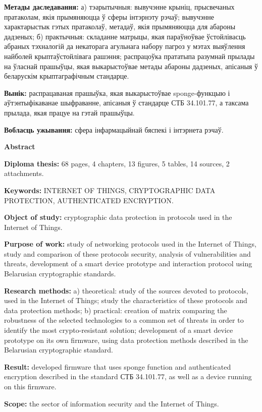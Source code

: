 \textbf{Метады даследавання:} а) тэарытычныя: вывучэнне крыніц, прысвечаных пратаколам, якія прымяняюцца 
ў сферы інтэрнэту рэчаў; вывучэнне характарыстык гэтых пратаколаў, метадаў, якія прымяняюцца для абароны 
дадзеных; б) практычныя: складанне матрыцы, якая параўноўвае ўстойлівасць абраных тэхналогій да некаторага 
агульнага набору пагроз у мэтах выяўлення найболей крыптаўстойлівага рашэння; распрацоўка прататыпа 
разумнай прылады на ўласнай прашыўцы, якая выкарыстоўвае метады абароны дадзеных, апісаныя ў беларускім 
крыптаграфічным стандарце.

\textbf{Вынік:} распрацаваная прашыўка, якая выкарыстоўвае sponge-функцыю і аўтэнтыфікаванае шыфраванне, 
апісаныя ў стандарце СТБ 34.101.77, а таксама прылада, якая працуе на гэтай прашыўцы.

\textbf{Вобласць ужывання:} сфера інфармацыйнай бяспекі і інтэрнета рэчаў.


\newpage
\begin{center}{\bf \Large Abstract}\end{center}

\textbf{Diploma thesis:} 68 pages, 4 chapters, 13 figures, 5 tables, 14 sources, 2 attachments.

\textbf{Keywords:} INTERNET OF THINGS, CRYPTOGRAPHIC DATA \newline PROTECTION, 
AUTHENTICATED ENCRYPTION.

\textbf{Object of study:} cryptographic data protection in protocols used in the Internet of Things.

\textbf{Purpose of work:} study of networking protocols used in the Internet of Things, study and 
comparison of these protocols security, analysis of vulnerabilities and threats, development 
of a smart device prototype and interaction protocol using Belarusian cryptographic standards.

\textbf{Research methods:} a) theoretical: study of the sources devoted to protocols, used in the 
Internet of Things; study the characteristics of these protocols and data protection methods; 
b) practical: creation of matrix comparing the robustness of the selected technologies to a common 
set of threats in order to identify the most crypto-resistant solution; development 
of a smart device prototype on its own firmware, using data protection methods described in the Belarusian 
cryptographic standard.

\textbf{Result:} developed firmware that uses sponge function and authenticated encryption described 
in the standard СТБ 34.101.77, as well as a device running on this firmware.

\textbf{Scope:} the sector of information security and the Internet of Things.
